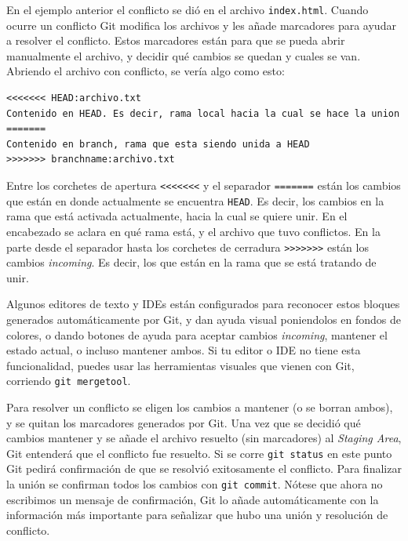 \documentclass[spanish, 12pt, a4paper]{article}
\begin{document}
En el ejemplo anterior el conflicto se dió en el archivo \texttt{index.html}.
Cuando ocurre un conflicto Git modifica los archivos y les añade marcadores para ayudar a resolver el conflicto.
Estos marcadores están para que se pueda abrir manualmente el archivo, y decidir qué cambios se quedan y cuales se van.
Abriendo el archivo con conflicto, se vería algo como esto:
\begin{lstlisting}
<<<<<<< HEAD:archivo.txt
Contenido en HEAD. Es decir, rama local hacia la cual se hace la union
=======
Contenido en branch, rama que esta siendo unida a HEAD
>>>>>>> branchname:archivo.txt
\end{lstlisting}

Entre los corchetes de apertura \texttt{<<<<<<<} y el separador \texttt{=======} están los cambios que están en donde actualmente se encuentra \texttt{HEAD}.
Es decir, los cambios en la rama que está activada actualmente, hacia la cual se quiere unir.
En el encabezado se aclara en qué rama está, y el archivo que tuvo conflictos.
En la parte desde el separador hasta los corchetes de cerradura \texttt{>>>>>>>} están los cambios \textit{incoming}.
Es decir, los que están en la rama que se está tratando de unir.

Algunos editores de texto y IDEs están configurados para reconocer estos bloques generados automáticamente por Git, y dan ayuda visual poniendolos en fondos de colores, o dando botones de ayuda para aceptar cambios \textit{incoming}, mantener el estado actual, o incluso mantener ambos.
Si tu editor o IDE no tiene esta funcionalidad, puedes usar las herramientas visuales que vienen con Git, corriendo \texttt{git mergetool}.

Para resolver un conflicto se eligen los cambios a mantener (o se borran ambos), y se quitan los marcadores generados por Git.
Una vez que se decidió qué cambios mantener y se añade el archivo resuelto (sin marcadores) al \textit{Staging Area}, Git entenderá que el conflicto fue resuelto.
Si se corre \texttt{git status} en este punto Git pedirá confirmación de que se resolvió exitosamente el conflicto.
Para finalizar la unión se confirman todos los cambios con \texttt{git commit}.
Nótese que ahora no escribimos un mensaje de confirmación, Git lo añade automáticamente con la información más importante para señalizar que hubo una unión y resolución de conflicto.
\end{document}
